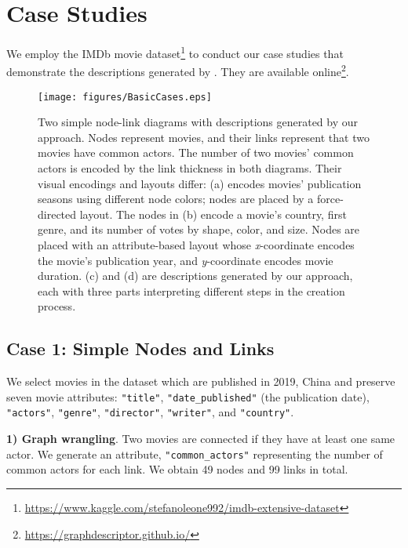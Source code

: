 \section{Case Studies}
We employ the IMDb movie dataset\footnote{\small\url{https://www.kaggle.com/stefanoleone992/imdb-extensive-dataset}} to conduct our case studies that demonstrate the descriptions generated by \ApproachName.
They are available online\footnote{\small\url{https://graphdescriptor.github.io/}}.


\begin{figure*}[ht]
    \centering
    \texttt{[image: figures/BasicCases.eps]}
    \caption{Two simple node-link diagrams with descriptions generated by our approach. 
    Nodes represent movies, and their links represent that two movies have common actors.
    The number of two movies' common actors is encoded by the link thickness in both diagrams.
    Their visual encodings and layouts differ:
    (a) encodes movies' publication seasons using different node colors; nodes are placed by a force-directed layout.  
    The nodes in (b) encode a movie's country, first genre, and its number of votes by shape, color, and size. 
    Nodes are placed with an attribute-based layout whose \textit{x}-coordinate encodes the movie's publication year, and \textit{y}-coordinate encodes movie duration.
    (c) and (d) are descriptions generated by our approach, each with three parts interpreting different steps in the creation process. }
  \label{fig:BasicCases}
\end{figure*}

\subsection{Case 1: Simple Nodes and Links}\label{sec:imdb_movies}

We select movies in the dataset which are published in 2019, China and preserve seven movie attributes: \texttt{"title"}, \texttt{"date\_published"} (the publication date), \texttt{"actors"}, \texttt{"genre"}, \texttt{"director"}, \texttt{"writer"}, and \texttt{"country"}.

\noindent \textbf{1) Graph wrangling}. 
Two movies are connected if they have at least one same actor.
We generate an attribute, \texttt{"common\_actors"} representing the number of common actors for each link. 
We obtain 49 nodes and 99 links in total.


